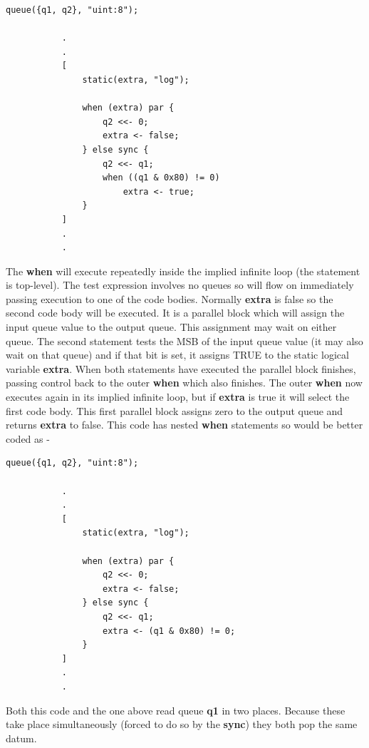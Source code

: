         \begin{lstlisting}[gobble=8, language=threepl]
           queue({q1, q2}, "uint:8");

           .
           .
           [
               static(extra, "log");

               when (extra) par {
                   q2 <<- 0;
                   extra <- false;
               } else sync {
                   q2 <<- q1;
                   when ((q1 & 0x80) != 0)
                       extra <- true;
               }
           ]
           .
           .
        \end{lstlisting}
        The {\bf when} will execute repeatedly inside the implied infinite loop
        (the statement is top-level). The test expression involves no queues so
        will flow on immediately passing execution to one of the code bodies.
        Normally {\bf extra} is false so the second code body will be executed.
        It is a parallel block which will assign the input queue value to the
        output queue. This assignment may wait on either queue. The second
        statement tests the MSB of the input queue value (it may also wait on
        that queue) and if that bit is set, it assigns TRUE to the static
        logical variable {\bf extra}. When both statements have executed the
        parallel block finishes, passing control back to the outer {\bf when}
        which also finishes. The outer {\bf when} now executes again in its
        implied infinite loop, but if {\bf extra} is true it will select the
        first code body. This first parallel block assigns zero to the output
        queue and returns {\bf extra} to false. This code has nested {\bf when}
        statements so would be better coded as -
        \begin{lstlisting}[gobble=8, language=threepl]
           queue({q1, q2}, "uint:8");

           .
           .
           [
               static(extra, "log");

               when (extra) par {
                   q2 <<- 0;
                   extra <- false;
               } else sync {
                   q2 <<- q1;
                   extra <- (q1 & 0x80) != 0;
               }
           ]
           .
           .
        \end{lstlisting}
        Both this code and the one above read queue {\bf q1} in two places.
        Because these take place simultaneously (forced to do so by the
        {\bf sync}) they both pop the same datum.

